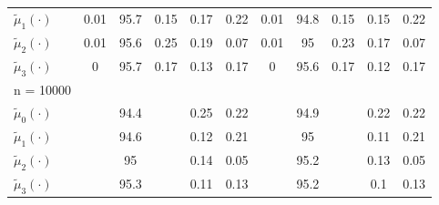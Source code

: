 \begin{table}[H]
\begin{center}
\begin{tabular}{l@{\hskip 1em}c@{\hskip 1em}c@{\hskip 1em}c@{\hskip 1em}c@{\hskip 1em}c@{\hskip 1em}c@{\hskip 1em}c@{\hskip 1em}c@{\hskip 1em}c@{\hskip 1em}c}
 $\tilde{\mu}_{1}(\cdot)$\vphantom{2500}  &   0.01 &       95.7 &     0.15 &         0.17 &         0.22 &               0.01 &                   94.8 &                 0.15 &                     0.15 &                     0.22 \\
 $\tilde{\mu}_{2}(\cdot)$\vphantom{2500}  &   0.01 &       95.6 &     0.25 &         0.19 &         0.07 &               0.01 &                   95   &                 0.23 &                     0.17 &                     0.07 \\
 $\tilde{\mu}_{3}(\cdot)$\vphantom{2500}  &   0    &       95.7 &     0.17 &         0.13 &         0.17 &               0    &                   95.6 &                 0.17 &                     0.12 &                     0.17 \\
 n = 10000                                &     &         &       &           &           &                 &                     &                   &                       &                       \\
 $\tilde{\mu}_{0}(\cdot)$\vphantom{10000} &     &       94.4 &       &         0.25 &         0.22 &                 &                   94.9 &                   &                     0.22 &                     0.22 \\
 $\tilde{\mu}_{1}(\cdot)$\vphantom{10000} &     &       94.6 &       &         0.12 &         0.21 &                 &                   95   &                   &                     0.11 &                     0.21 \\
 $\tilde{\mu}_{2}(\cdot)$\vphantom{10000} &     &       95   &       &         0.14 &         0.05 &                 &                   95.2 &                   &                     0.13 &                     0.05 \\
 $\tilde{\mu}_{3}(\cdot)$\vphantom{10000} &     &       95.3 &       &         0.11 &         0.13 &                 &                   95.2 &                   &                     0.1  &                     0.13 \\
\hline
\end{tabular}
\end{center}
\medskip
\end{table}
